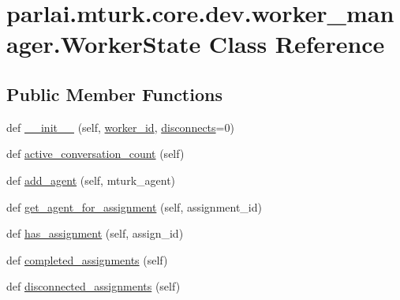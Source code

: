 \hypertarget{classparlai_1_1mturk_1_1core_1_1dev_1_1worker__manager_1_1WorkerState}{}\section{parlai.\+mturk.\+core.\+dev.\+worker\+\_\+manager.\+Worker\+State Class Reference}
\label{classparlai_1_1mturk_1_1core_1_1dev_1_1worker__manager_1_1WorkerState}
\subsection*{Public Member Functions}
\begin{DoxyCompactItemize}
\item 
def \hyperlink{classparlai_1_1mturk_1_1core_1_1dev_1_1worker__manager_1_1WorkerState_ad5b7c2eef6d44cb5856beb7f951bc76a}{\+\_\+\+\_\+init\+\_\+\+\_\+} (self, \hyperlink{classparlai_1_1mturk_1_1core_1_1dev_1_1worker__manager_1_1WorkerState_aa4019a351d1a1e41bc7a8c26229b2772}{worker\+\_\+id}, \hyperlink{classparlai_1_1mturk_1_1core_1_1dev_1_1worker__manager_1_1WorkerState_aaf0e1e68c219df754da29d8188150796}{disconnects}=0)
\item 
def \hyperlink{classparlai_1_1mturk_1_1core_1_1dev_1_1worker__manager_1_1WorkerState_a16edfbd2d655096cbd8c42ab44aad988}{active\+\_\+conversation\+\_\+count} (self)
\item 
def \hyperlink{classparlai_1_1mturk_1_1core_1_1dev_1_1worker__manager_1_1WorkerState_a36a49c3444954cb32d3500c834dd8f6a}{add\+\_\+agent} (self, mturk\+\_\+agent)
\item 
def \hyperlink{classparlai_1_1mturk_1_1core_1_1dev_1_1worker__manager_1_1WorkerState_a39acee8124982d290385f35365a72051}{get\+\_\+agent\+\_\+for\+\_\+assignment} (self, assignment\+\_\+id)
\item 
def \hyperlink{classparlai_1_1mturk_1_1core_1_1dev_1_1worker__manager_1_1WorkerState_a739a3208abd2d6d674694e1d6aebc292}{has\+\_\+assignment} (self, assign\+\_\+id)
\item 
def \hyperlink{classparlai_1_1mturk_1_1core_1_1dev_1_1worker__manager_1_1WorkerState_af8edaccdc36152c54f0a4083edcad3b3}{completed\+\_\+assignments} (self)
\item 
def \hyperlink{classparlai_1_1mturk_1_1core_1_1dev_1_1worker__manager_1_1WorkerState_a484636b6cf7e2bd4772369345d3854fe}{disconnected\+\_\+assignments} (self)
\end{DoxyCompactItemize}
